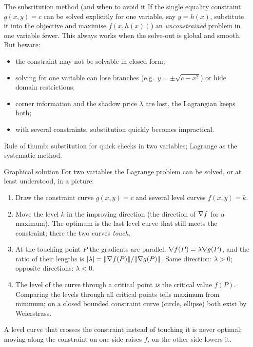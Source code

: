 \begin{rulebox}{The substitution method (and when to avoid it}
If the single equality constraint $g(x, y) = c$ can be solved explicitly for
one variable, say $y = h(x)$, substitute it into the objective and maximise
$f(x, h(x))$) an \emph{unconstrained} problem in one variable fewer. This
always works when the solve-out is global and smooth. But beware:
\begin{itemize}[leftmargin=1.8em,itemsep=0.4ex]
  \item the constraint may not be solvable in closed form;
  \item solving for one variable can lose branches (e.g.\
        $y = \pm\sqrt{c - x^2}$) or hide domain restrictions;
  \item corner information and the shadow price $\lambda$ are lost, the
        Lagrangian keeps both;
  \item with several constraints, substitution quickly becomes impractical.
\end{itemize}
Rule of thumb: substitution for quick checks in two variables; Lagrange as
the systematic method.
\end{rulebox}

\begin{rulebox}{Graphical solution}
For two variables the Lagrange problem can be solved, or at least
understood, in a picture:
\begin{enumerate}[leftmargin=1.8em,itemsep=0.3ex]
  \item Draw the constraint curve $g(x,y)=c$ and several level curves
        $f(x,y)=k$.
  \item Move the level $k$ in the improving direction (the direction of
        $\nabla f$ for a maximum). The optimum is the last level curve that
        still meets the constraint; there the two curves \emph{touch}.
  \item At the touching point $P$ the gradients are parallel,
        $\nabla f(P)=\lambda\nabla g(P)$, and the ratio of their lengths is
        $|\lambda|=\|\nabla f(P)\|/\|\nabla g(P)\|$. Same direction:
        $\lambda>0$; opposite directions: $\lambda<0$.
  \item The level of the curve through a critical point \emph{is} the
        critical value $f(P)$. Comparing the levels through all critical
        points tells maximum from minimum; on a closed bounded constraint
        curve (circle, ellipse) both exist by Weierstrass.
\end{enumerate}
A level curve that crosses the constraint instead of touching it is never
optimal: moving along the constraint on one side raises $f$, on the other
side lowers it.
\end{rulebox}

